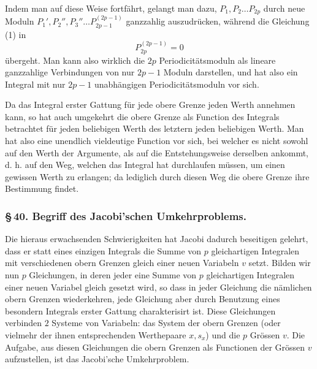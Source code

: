 \documentclass[10pt]{article}
\begin{document}
Indem man auf diese Weise fortfährt, gelangt man dazu, \(P_1,P_2\ldots P_{2p}\) durch neue Moduln \(P_1',P_2'',P_3''\ldots P_{2p-1}^{(2p-1)}\) ganzzahlig auszudrücken, während die Gleichung (1) in
\[
P_{2p}^{(2p-1)}=0
\]
übergeht. Man kann also wirklich die \(2p\) Periodicitätsmoduln als lineare ganzzahlige Verbindungen von nur \(2p-1\) Moduln darstellen, und hat also ein Integral mit nur \(2p-1\) unabhängigen Periodicitätsmoduln vor sich.

Da das Integral erster Gattung für jede obere Grenze jeden Werth annehmen kann, so hat auch umgekehrt die obere Grenze als Function des Integrals betrachtet für jeden beliebigen Werth des letztern jeden beliebigen Werth. Man hat also eine unendlich vieldeutige Function vor sich, bei welcher es nicht sowohl auf den Werth der Argumente, als auf die Entstehungsweise derselben ankommt, d. h. auf den Weg, welchen das Integral hat durchlaufen müssen, um einen gewissen Werth zu erlangen; da lediglich durch diesen Weg die obere Grenze ihre Bestimmung findet.

\subsubsection*{\S\,40. Begriff des Jacobi'schen Umkehrproblems.}

Die hieraus erwachsenden Schwierigkeiten hat Jacobi dadurch beseitigen gelehrt, dass er statt eines einzigen Integrals die Summe von \(p\) gleichartigen Integralen mit verschiedenen obern Grenzen gleich einer neuen Variabeln \(v\) setzt. Bilden wir nun \(p\) Gleichungen, in deren jeder eine Summe von \(p\) gleichartigen Integralen einer neuen Variabel gleich gesetzt wird, so dass in jeder Gleichung die nämlichen obern Grenzen wiederkehren, jede Gleichung aber durch Benutzung eines besondern Integrals erster Gattung charakterisirt ist. Diese Gleichungen verbinden \(2\) Systeme von Variabeln: das System der obern Grenzen (oder vielmehr der ihnen entsprechenden Werthepaare \(x,s_x\)) und die \(p\) Grössen \(v\). Die Aufgabe, aus diesen Gleichungen die obern Grenzen als Functionen der Grössen \(v\) aufzustellen, ist das Jacobi'sche Umkehrproblem.
\end{document}
